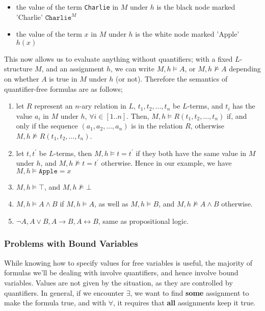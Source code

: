 \documentclass[a4paper, 12pt]{article}
\begin{document}
                \begin{itemize}
                    \itemsep0em
                    \item the value of the term \texttt{Charlie} in $M$ under $h$ is the black node marked 'Charlie' \hfill $\texttt{Charlie}^M$
                    \item the value of the term $x$ in $M$ under $h$ is the white node marked 'Apple' \hfill $h(x)$
                \end{itemize}
                This now allows us to evaluate anything without quantifiers; with a fixed $L$-structure $M$, and an assignment $h$, we can write $M, h \vDash A$, or $M, h \nvDash A$ depending on whether $A$ is true in $M$ under $h$ (or not). Therefore the semantics of quantifier-free formulas are as follows;
                \begin{enumerate}[1.]
                    \itemsep0em
                    \item let $R$ represent an $n$-ary relation in $L$, $t_1, t_2, ..., t_n$ be $L$-terms, and $t_i$ has the value $a_i$ in $M$ under $h$, $\forall i \in [1..n]$. Then, $M, h \vDash R(t_1, t_2, ..., t_n)$ if, and only if the sequence $(a_1, a_2, ..., a_n)$ is in the relation $R$, otherwise $M, h \nvDash R(t_1, t_2, ..., t_n)$.
                    \item let $t, t^\prime$ be $L$-terms, then $M, h \vDash t = t^\prime$ if they both have the same value in $M$ under $h$, and $M, h \nvDash t = t^\prime$ otherwise.
                        \subitem Hence in our example, we have $M, h \vDash \texttt{Apple} = x$
                    \item $M, h \vDash \top$, and $M,h \nvDash \bot$
                    \item $M, h \vDash A \land B$ if $M, h \vDash A$, as well as $M, h \vDash B$, and $M, h \nvDash A \land B$ otherwise.
                    \item $\neg A, A \lor B, A \rightarrow B, A \leftrightarrow B$, same as propositional logic.
                \end{enumerate}
            \subsubsection*{Problems with Bound Variables}
                While knowing how to specify values for free variables is useful, the majority of formulas we'll be dealing with involve quantifiers, and hence involve bound variables. Values are not given by the situation, as they are controlled by quantifiers. In general, if we encounter $\exists$, we want to find \textbf{some} assignment to make the formula true, and with $\forall$, it requires that \textbf{all} assignments keep it true.
                \medskip
\end{document}
